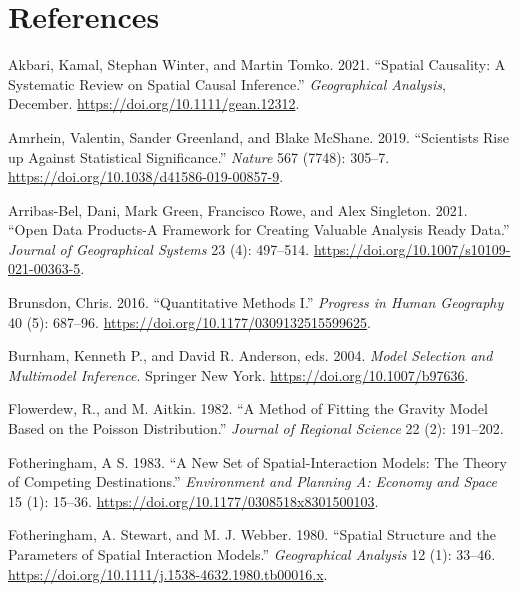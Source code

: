 \documentclass[11pt,letterpaper]{article}
\newlength{\cslhangindent}
\newlength{\cslentryspacingunit} %
\newenvironment{CSLReferences}[2] %
 {%
  \setlength{\parindent}{0pt}
  \ifodd #1
  \let\oldpar\par
  \def\par{\hangindent=\cslhangindent\oldpar}
  \fi
  \setlength{\parskip}{#2\cslentryspacingunit}
 }%
 {}
\begin{document}
\hypertarget{references}{%
\section*{References}\label{references}}

\hypertarget{refs}{}
\begin{CSLReferences}{1}{0}
\leavevmode{}%
Akbari, Kamal, Stephan Winter, and Martin Tomko. 2021. {``Spatial Causality: A Systematic Review on Spatial Causal Inference.''} \emph{Geographical Analysis}, December. \url{https://doi.org/10.1111/gean.12312}.

\leavevmode{}%
Amrhein, Valentin, Sander Greenland, and Blake McShane. 2019. {``Scientists Rise up Against Statistical Significance.''} \emph{Nature} 567 (7748): 305--7. \url{https://doi.org/10.1038/d41586-019-00857-9}.

\leavevmode{}%
Arribas-Bel, Dani, Mark Green, Francisco Rowe, and Alex Singleton. 2021. {``Open Data Products-A Framework for Creating Valuable Analysis Ready Data.''} \emph{Journal of Geographical Systems} 23 (4): 497--514. \url{https://doi.org/10.1007/s10109-021-00363-5}.

\leavevmode{}%
Brunsdon, Chris. 2016. {``Quantitative Methods I.''} \emph{Progress in Human Geography} 40 (5): 687--96. \url{https://doi.org/10.1177/0309132515599625}.

\leavevmode{}%
Burnham, Kenneth P., and David R. Anderson, eds. 2004. \emph{Model Selection and Multimodel Inference}. Springer New York. \url{https://doi.org/10.1007/b97636}.

\leavevmode{}%
Flowerdew, R., and M. Aitkin. 1982. {``A Method of Fitting the Gravity Model Based on the {Poisson} Distribution.''} \emph{Journal of Regional Science} 22 (2): 191--202.

\leavevmode{}%
Fotheringham, A S. 1983. {``A New Set of Spatial-Interaction Models: The Theory of Competing Destinations.''} \emph{Environment and Planning A: Economy and Space} 15 (1): 15--36. \url{https://doi.org/10.1177/0308518x8301500103}.

\leavevmode{}%
Fotheringham, A. Stewart, and M. J. Webber. 1980. {``Spatial {Structure} and the {Parameters} of {Spatial} {Interaction} {Models}.''} \emph{Geographical Analysis} 12 (1): 33--46. \url{https://doi.org/10.1111/j.1538-4632.1980.tb00016.x}.


\end{CSLReferences}
\end{document}
